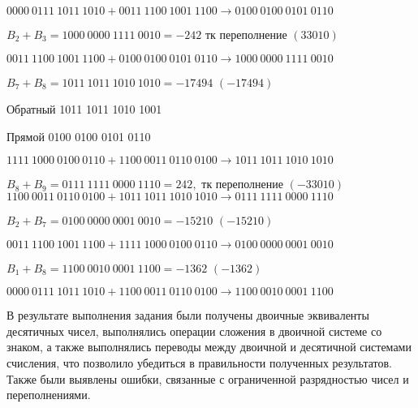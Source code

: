 \documentclass{article}
\begin{document}
$0000\:0111\:1011\:1010 + 0011\:1100\:1001\:1100 \rightarrow 0100\:0100\:0101\:0110$

$B_2 + B_3 = 1000\:0000\:1111\:0010 = -242$ тк переполнение $(33010)$

$0011\:1100\:1001\:1100 + 0100\:0100\:0101\:0110 \rightarrow 1000\:0000\:1111\:0010$

$B_7 + B_8 = 1011\:1011\:1010\:1010 = -17494$ $(-17494)$

Обратный 1011 1011 1010 1001

Прямой 0100 0100 0101 0110

$1111\:1000\:0100\:0110 + 1100\:0011\:0110\:0100 \rightarrow 1011\:1011\:1010\:1010$

$B_8 + B_9 = 0111\:1111\:0000\:1110 = 242,$ тк переполнение $(-33010)$
$1100\:0011\:0110\:0100 + 1011\:1011\:1010\:1010 \rightarrow 0111\:1111\:0000\:1110$

$B_2 + B_7 = 0100\:0000\:0001\:0010 = -15210$ $(-15210)$

$0011\:1100\:1001\:1100 + 1111\:1000\:0100\:0110 \rightarrow 0100\:0000\:0001\:0010$

$B_1 + B_8 = 1100\:0010\:0001\:1100 = -1362$ $(-1362)$

$0000\:0111\:1011\:1010 + 1100\:0011\:0110\:0100 \rightarrow 1100\:0010\:0001\:1100$

В результате выполнения задания были получены двоичные эквиваленты десятичных чисел, выполнялись операции сложения в двоичной системе со знаком, а также выполнялись переводы между двоичной и десятичной системами счисления, что позволило убедиться в правильности полученных результатов. Также были выявлены ошибки, связанные с ограниченной разрядностью чисел и переполнениями.
\end{document}
